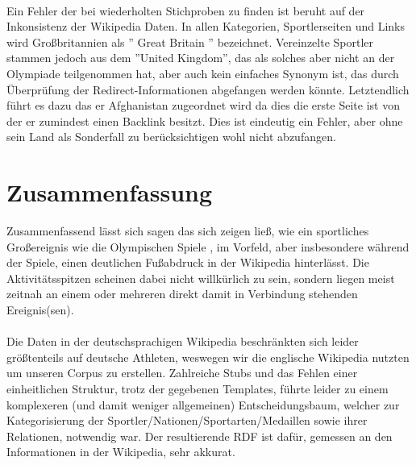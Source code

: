 \documentclass[pagesize=auto, titlepage=on]{scrartcl}
\begin{document}
\paragraph{}
Ein Fehler der bei wiederholten Stichproben zu finden ist beruht auf der Inkonsistenz der Wikipedia Daten.
In allen Kategorien, Sportlerseiten und Links wird  Großbritannien  als '' Great Britain '' bezeichnet.
Vereinzelte Sportler stammen jedoch aus dem ''United Kingdom'', das als solches aber nicht an der Olympiade teilgenommen hat,
aber auch kein einfaches Synonym ist, das durch Überprüfung der Redirect-Informationen abgefangen werden könnte.
Letztendlich führt es dazu das er Afghanistan zugeordnet wird da dies die erste Seite ist von der er zumindest einen Backlink besitzt. Dies ist eindeutig ein Fehler, aber ohne sein Land als Sonderfall zu berücksichtigen wohl nicht abzufangen.

\section{Zusammenfassung}
\label{sec:zusammenfassung}
Zusammenfassend lässt sich sagen das sich zeigen ließ, wie ein sportliches Großereignis wie die Olympischen Spiele , im Vorfeld, aber insbesondere während der Spiele, einen deutlichen Fußabdruck in der Wikipedia hinterlässt. Die Aktivitätsspitzen scheinen dabei nicht willkürlich zu sein, sondern liegen meist zeitnah an einem oder mehreren  direkt damit in Verbindung stehenden Ereignis(sen).
\paragraph{}
Die Daten in der deutschsprachigen Wikipedia beschränkten sich leider größtenteils auf deutsche Athleten, weswegen wir die englische Wikipedia nutzten um unseren Corpus zu erstellen. Zahlreiche Stubs und das Fehlen einer einheitlichen Struktur, trotz der gegebenen Templates, führte leider zu einem komplexeren (und damit weniger allgemeinen) Entscheidungsbaum, welcher zur Kategorisierung der Sportler/Nationen/Sportarten/Medaillen sowie ihrer Relationen, notwendig war.
Der resultierende RDF ist dafür, gemessen an den Informationen in der Wikipedia, sehr akkurat.
\printbibliography
\end{document}
